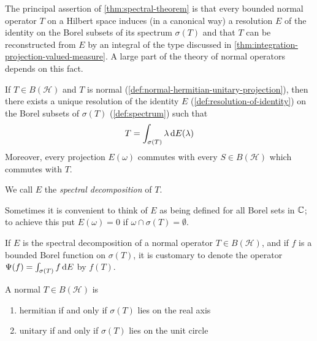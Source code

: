 The principal assertion of \autoref{thm:spectral-theorem} is that every bounded normal operator $T$ on a Hilbert space induces (in a canonical way) a resolution $E$ of the identity on the Borel subsets of its spectrum $\sigma(T)$ and that $T$ can be reconstructed from $E$ by an integral of the type discussed in \autoref{thm:integration-projection-valued-measure}. 
A large part of the theory of normal operators depends on this fact.

\begin{theorem}\label{thm:spectral-theorem}
If $T \in B(\mathcal{H})$ and $T$ is normal (\autoref{def:normal-hermitian-unitary-projection}), then there exists a unique resolution of the identity $E$ (\autoref{def:resolution-of-identity}) on the Borel subsets of $\sigma(T)$ (\autoref{def:spectrum}) such that
\begin{equation}\label{eq:spectral-theorem}
T = \int_{\sigma(T)} \lambda \,\mathrm{d} E(\lambda)
\end{equation}
Moreover, every projection $E(\omega)$ commutes with every $S \in B(\mathcal{H})$ which commutes with $T$.
\end{theorem}

We call $E$ the \emph{spectral decomposition} of $T$.

Sometimes it is convenient to think of $E$  as being defined for all Borel sets in $\mathbb{C}$;
to achieve this put $E(\omega) = 0$ if $\omega \cap \sigma(T) = \emptyset$.



\begin{notation}
If $E$ is the spectral decomposition of a normal operator $T \in B(\mathcal{H})$, and if $f$ is a bounded Borel function on $\sigma(T)$, it is customary to denote the operator
\(
\Psi(f) = \int_{\sigma(T)} f \,\mathrm{d} E
\)
by $f(T)$.
\end{notation}


\begin{theorem}\label{thm:normal-bounded-operator-spectral-properties}
A normal $T \in B(\mathcal{H})$ is 
\begin{enumerate}[label=(\alph*)]
\item hermitian if and only if $\sigma(T)$ lies on the real axis
\item unitary if and only if $\sigma(T)$ lies on the unit circle
\qedhere
\end{enumerate}
\end{theorem}












